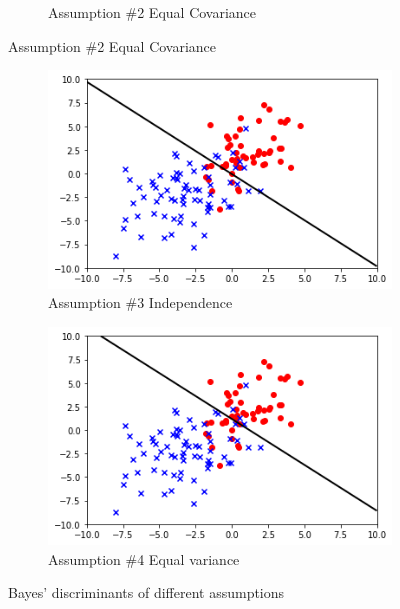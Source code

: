 \documentclass{article}
\begin{document}
\begin{enumerate}
\begin{figure}[h!]
\begin{subfigure}[b]{0.45\textwidth}
            \caption{Assumption \#2 Equal Covariance}
            \label{fig:assump2}
        \end{subfigure}
\end{figure}
\begin{figure}[h!]
    \centering
    \begin{subfigure}[b]{0.45\textwidth}
        \centering
        \includegraphics[width=\textwidth]{images/assump3.png}
        \caption{Assumption \#3 Independence}
        \label{fig:assump3}
    \end{subfigure}
    \hfill
    \begin{subfigure}[b]{0.45\textwidth}
        \centering
        \includegraphics[width=\textwidth]{images/assump4.png}
        \caption{Assumption \#4 Equal variance}
        \label{fig:assump4}
    \end{subfigure}
    \caption{Bayes' discriminants of different assumptions}
    \label{fig:disc}
\end{figure}
    


\end{enumerate}
\end{document}

